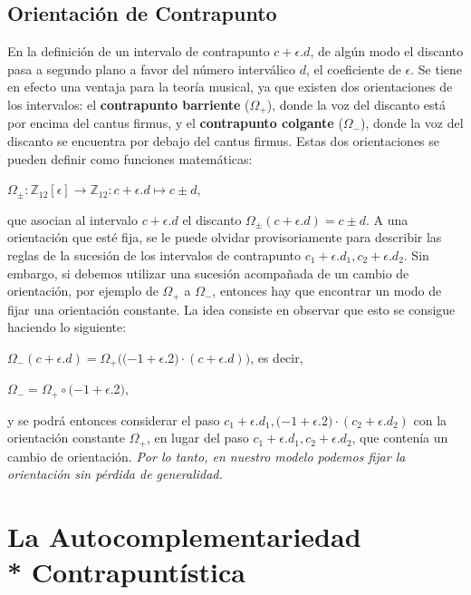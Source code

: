 \documentclass[letterpaper,12pt]{book}
\theoremstyle{definition} \newtheorem{Def}{Definición}[chapter]
\theoremstyle{definition} \newtheorem{Teo}{Teorema}[chapter]
\theoremstyle{definition} \newtheorem{Pro}{Proposición}[chapter]
\theoremstyle{definition} \newtheorem{Lema}{Lema}[chapter]
\begin{document}
\subsection{Orientación de Contrapunto}\label{Orientacion}

En la definición de un intervalo de contrapunto $c+\epsilon.d$, de algún modo el discanto pasa a segundo plano a favor del número interválico $d$, el coeficiente de $\epsilon$. Se tiene en efecto una ventaja para la teoría musical, ya que existen dos orientaciones de los intervalos: el \textbf{contrapunto barriente} ($\Omega_+$), donde la voz del discanto está por encima del cantus firmus, 
y el \textbf{contrapunto colgante} ($\Omega_-$), donde la voz del discanto se encuentra por debajo del cantus firmus. Estas dos orientaciones se pueden definir como funciones matemáticas:

\begin{description}
\centering
 \item $\Omega_\pm : \mathbb{Z}_{12}[\epsilon] \to\mathbb{Z}_{12} : c+\epsilon.d \mapsto c\pm d$, 
 \end{description}
 que asocian al intervalo $c+\epsilon.d$ el discanto $\Omega_\pm(c+\epsilon.d)=c\pm d$. A una orientación que esté fija, se le puede olvidar provisoriamente para describir las reglas de la sucesión de los intervalos de contrapunto $c_1+\epsilon.d_1,c_2+\epsilon.d_2$. Sin embargo, si debemos utilizar una sucesión acompañada de un cambio de orientación, por ejemplo de $\Omega_+$ a $\Omega_-$, entonces hay que encontrar un modo de fijar una orientación constante. La idea consiste en observar que esto se consigue haciendo lo siguiente:

\begin{description}
\centering 
 \item $\Omega_-(c+\epsilon.d)=\Omega_+((-1+\epsilon.$2$)\cdot(c+\epsilon.d))$, es decir, 
 \item $\Omega_-=\Omega_+\circ(-1+\epsilon.$2$)$, 
\end{description}
y se podrá entonces considerar el paso $c_1+\epsilon.d_1,(-1+\epsilon.$2$)\cdot(c_2+\epsilon.d_2)$ con la orientación constante $\Omega_+$, en lugar del paso $c_1+\epsilon.d_1,c_2+\epsilon.d_2$, que contenía un cambio de orientación. \emph{Por lo tanto, en nuestro modelo podemos fijar la orientación sin pérdida de generalidad.}

\section[La Autocomplementariedad Contrapuntística]{La Autocomplementariedad \\* Contrapuntística}
\end{document}
